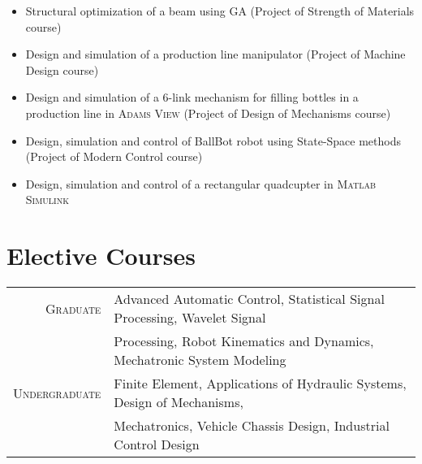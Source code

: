 \documentclass[a4paper,9pt]{article}
\begin{document}
\begin{itemize}

\item  Structural optimization of a beam using GA (Project of Strength of Materials course)

\item  Design and simulation of a production line manipulator (Project of Machine Design course)


\item  Design and simulation of a 6-link mechanism for filling bottles in a production line in \textsc{Adams View} (Project of Design of Mechanisms course)

\item  Design, simulation and control of BallBot robot using State-Space methods (Project of Modern Control course)

\item  Design, simulation and control of a rectangular quadcupter in \textsc{Matlab Simulink}

\end{itemize}





\section{Elective Courses}
\begin{tabular}{rl}
 \textsc{Graduate} & Advanced Automatic Control, Statistical Signal Processing, Wavelet Signal \\
 &  Processing, Robot Kinematics and Dynamics, Mechatronic System Modeling\\
 \textsc{Undergraduate} & Finite Element, Applications of Hydraulic Systems, Design of Mechanisms,\\
 &Mechatronics, Vehicle Chassis Design, Industrial Control Design \\

\end{tabular}


\end{document}
